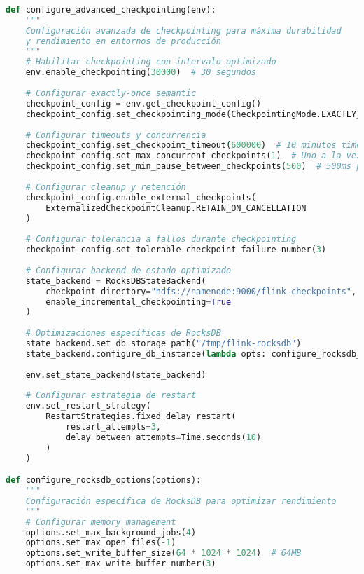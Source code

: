 \begin{lstlisting}[language=python, caption=Configuración Optimizada de Estado y Checkpointing, label=lst:flink_checkpointing]
def configure_advanced_checkpointing(env):
    """
    Configuración avanzada de checkpointing para máxima durabilidad
    y rendimiento en entornos de producción
    """
    # Habilitar checkpointing con intervalo optimizado
    env.enable_checkpointing(30000)  # 30 segundos
    
    # Configurar exactly-once semantic
    checkpoint_config = env.get_checkpoint_config()
    checkpoint_config.set_checkpointing_mode(CheckpointingMode.EXACTLY_ONCE)
    
    # Configurar timeouts y concurrencia
    checkpoint_config.set_checkpoint_timeout(600000)  # 10 minutos timeout
    checkpoint_config.set_max_concurrent_checkpoints(1)  # Uno a la vez
    checkpoint_config.set_min_pause_between_checkpoints(500)  # 500ms pausa mínima
    
    # Configurar cleanup y retención
    checkpoint_config.enable_external_checkpoints(
        ExternalizedCheckpointCleanup.RETAIN_ON_CANCELLATION
    )
    
    # Configurar tolerancia a fallos durante checkpointing
    checkpoint_config.set_tolerable_checkpoint_failure_number(3)
    
    # Configurar backend de estado optimizado
    state_backend = RocksDBStateBackend(
        checkpoint_directory="hdfs://namenode:9000/flink-checkpoints",
        enable_incremental_checkpointing=True
    )
    
    # Optimizaciones específicas de RocksDB
    state_backend.set_db_storage_path("/tmp/flink-rocksdb")
    state_backend.configure_db_instance(lambda opts: configure_rocksdb_options(opts))
    
    env.set_state_backend(state_backend)
    
    # Configurar estrategia de restart
    env.set_restart_strategy(
        RestartStrategies.fixed_delay_restart(
            restart_attempts=3,
            delay_between_attempts=Time.seconds(10)
        )
    )

def configure_rocksdb_options(options):
    """
    Configuración específica de RocksDB para optimizar rendimiento
    """
    # Configurar memory management
    options.set_max_background_jobs(4)
    options.set_max_open_files(-1)
    options.set_write_buffer_size(64 * 1024 * 1024)  # 64MB
    options.set_max_write_buffer_number(3)
    

\end{lstlisting}
